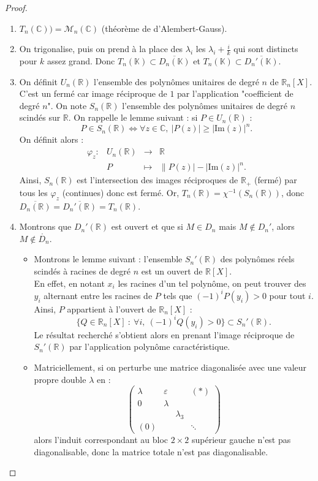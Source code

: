 \documentclass[french]{article}
\newcommand{\R}{\mathbb{R}}
\newcommand{\C}{\mathbb{C}}
\newcommand{\K}{\mathbb{K}}
\newcommand{\inv}{^{-1}}
\theoremstyle{definition}
\begin{document}
\begin{proof}
	\begin{enumerate}
		\item $T_n(\C))=\mathcal{M}_n(\C)$ (théorème de d'Alembert-Gauss).
		\item On trigonalise, puis on prend à la place des $\lambda_i$ les $\lambda_i+\displaystyle\frac{i}{k}$ qui sont distincts pour $k$ assez grand. Donc $T_n(\K)\subset\overline{D_n(\K)}$ et $T_n(\K)\subset\overline{D_n'(\K)}$.
		\item On définit $U_n(\R)$ l'ensemble des polynômes unitaires de degré $n$ de $\R_n[X]$. C'est un fermé car image réciproque de ${1}$ par l'application "coefficient de degré $n$". On note $S_n(\R)$ l'ensemble des polynômes unitaires de degré $n$ scindés sur $\R$. On rappelle le lemme suivant : si $P\in U_n(\R)$ :
		$$P\in S_n(\R)\iff\forall z\in\C,\ \lvert P(z)\rvert\geqslant\lvert\text{Im}(z)\rvert^n.$$ On définit alors :
		$$\begin{array}{lrcl}
			\varphi_z:&U_n(\R)&\longrightarrow&\R\\
			&P&\longmapsto&\lVert P(z)\rvert-\lvert\text{Im}(z)\rvert^n.
		\end{array}$$
		Ainsi, $S_n(\R)$ est l'intersection des images réciproques de $\R_+$ (fermé) par tous les $\varphi_z$ (continues) donc est fermé. Or, $T_n(\R)=\chi\inv(S_n(\R))$, donc $\overline{D_n(\R)}=\overline{D_n'(\R)}=T_n(\R)$.
		\item Montrons que $D_n'(\R)$ est ouvert et que si $M\in D_n$ mais $M\notin D_n'$, alors $M\notin \mathring{D_n}$.
		\begin{itemize}
			\item Montrons le lemme suivant : l'ensemble $S_n'(\R)$ des polynômes réels scindés à racines de degré $n$ est un ouvert de $\R[X]$.\\
			En effet, en notant $x_i$ les racines d'un tel polynôme, on peut trouver des $y_i$ alternant entre les racines de $P$ tels que $(-1)^iP(y_i)>0$ pour tout $i$. Ainsi, $P$ appartient à l'ouvert de $\R_n[X]$ : $$\{Q\in\R_n[X]\ :\ \forall i,\ (-1)^i Q(y_i)>0\}\subset S_n'(\R).$$
			Le résultat recherché s'obtient alors en prenant l'image réciproque de $S_n'(\R)$ par l'application polynôme caractéristique.
			\item Matriciellement, si on perturbe une matrice diagonalisée avec une valeur propre double $\lambda$ en :
			$$\begin{pmatrix}
				\lambda&\varepsilon&&(*)\\
				0&\lambda&&\\
				&&\lambda_3&\\
				(0)&&&\ddots
			\end{pmatrix}$$ alors l'induit correspondant au bloc $2\times 2$ supérieur gauche n'est pas diagonalisable, donc la matrice totale n'est pas diagonalisable.
		\end{itemize}
	\end{enumerate}
\end{proof}
\end{document}
